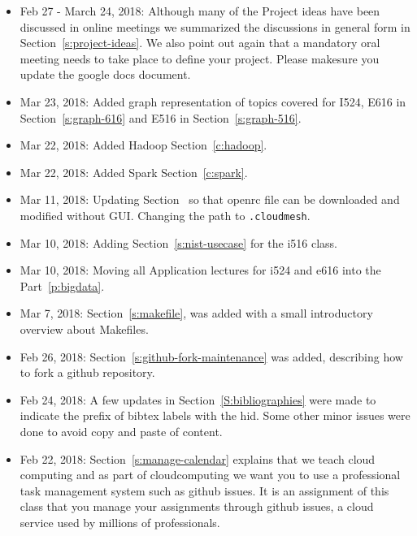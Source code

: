 \begin{itemize}
\item Feb 27 - March 24, 2018: Although many of the Project ideas have been discussed
  in online meetings we summarized the discussions in general form in
  Section~\ref{s:project-ideas}.
  We also point out again that a mandatory oral meeting needs to take
  place to define your project. Please makesure you update the google
  docs document.

\item Mar 23, 2018: Added graph representation of topics covered for
  I524, E616 in Section~\ref{s:graph-616} and E516 in Section~\ref{s:graph-516}.

\item Mar 22, 2018: Added Hadoop Section~\ref{c:hadoop}.

\item Mar 22, 2018: Added Spark Section~\ref{c:spark}.

\item Mar 11, 2018: Updating Section~\label{s:chameleon-openstack} so
  that openrc file can be downloaded and modified without
  GUI. Changing the path to \verb|.cloudmesh|.

\item Mar 10, 2018: Adding Section~\ref{s:nist-usecase} for the i516 class.

\item Mar 10, 2018: Moving all Application lectures for i524 and e616
  into the Part~\ref{p:bigdata}.

\item Mar 7, 2018: Section~\ref{s:makefile}, was added with a small
  introductory overview about Makefiles.

\item Feb 26, 2018: Section~\ref{s:github-fork-maintenance} was added,
  describing how to fork a github repository.

\item Feb 24, 2018: A few updates in Section~\ref{S:bibliographies}
  were made to indicate the prefix of bibtex labels with the hid. Some
  other minor issues were done to avoid copy and paste of content.

\item Feb 22, 2018: Section~\ref{s:manage-calendar} explains that we
  teach cloud computing and as part of cloudcomputing we want you to
  use a professional task management system such as github issues. It
  is an assignment of this class that you manage your assignments
  through github issues, a cloud service used by millions of
  professionals.


\end{itemize}
